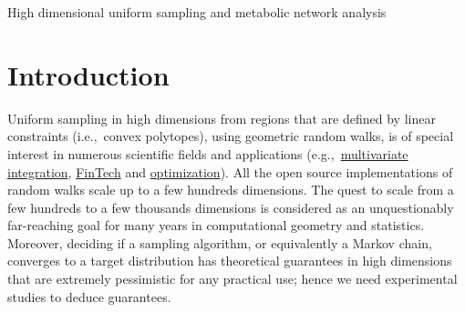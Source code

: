 \documentclass[a4paper, 12pt]{article}
\def \c++{{\tt C++}}
\def\volesti{{\tt volesti}}
\def\cran{{\tt CRAN}}
\begin{document}
\begin{center}
    \Large{High dimensional uniform sampling and metabolic network analysis}
\end{center}








\section{Introduction}
Uniform sampling in high dimensions from regions that are defined by linear constraints (i.e.,~convex polytopes), using geometric random walks, is of special interest in numerous scientific fields and applications (e.g.,\ \textcolor{blue}{\href{https://arxiv.org/pdf/2001.04566v1.pdf}{multivariate integration}}, \textcolor{blue}{\href{https://drops.dagstuhl.de/opus/volltexte/2018/8732/}{FinTech}} and  \textcolor{blue}{\href{https://dl.acm.org/doi/10.1145/1008731.1008733}{optimization}}). %
All the open source implementations of random walks scale up to a few hundreds dimensions. The quest to scale from a few hundreds to a few thousands dimensions is
considered as an unquestionably far-reaching goal for many years in computational geometry and statistics. 
Moreover, deciding 
if a sampling algorithm, or equivalently a Markov chain, converges to a target distribution
has theoretical guarantees in high dimensions that are extremely pessimistic for any practical use; hence we need experimental studies to deduce  guarantees.
\end{document}
